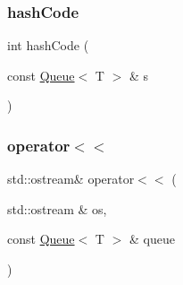 \subsubsection{\texorpdfstring{hash\+Code}{hashCode}}
{\footnotesize\ttfamily int hash\+Code (\begin{DoxyParamCaption}\item[{const \mbox{\hyperlink{classQueue}{Queue}}$<$ T $>$ \&}]{s }\end{DoxyParamCaption})\hspace{0.3cm}{\ttfamily [friend]}}

\mbox{\label{classQueue_aaa89558f231cdb840804e46fc467902e}} 
\subsubsection{\texorpdfstring{operator$<$$<$}{operator<<}}
{\footnotesize\ttfamily std\+::ostream\& operator$<$$<$ (\begin{DoxyParamCaption}\item[{std\+::ostream \&}]{os,  }\item[{const \mbox{\hyperlink{classQueue}{Queue}}$<$ T $>$ \&}]{queue }\end{DoxyParamCaption})\hspace{0.3cm}{\ttfamily [friend]}}

